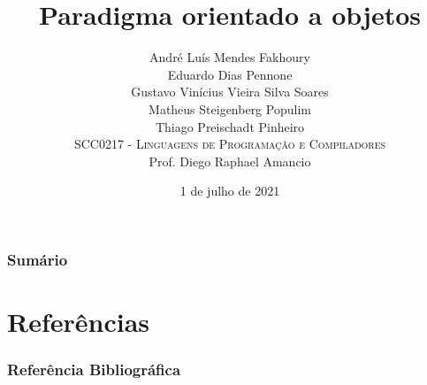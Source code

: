 \documentclass{beamer}
\title[Paradigma orientado a objetos]{Paradigma orientado a objetos}
\author[André, Eduardo, Gustavo, Matheus, Thiago]{
André Luís Mendes Fakhoury\\ Eduardo Dias Pennone\\ Gustavo Vinícius Vieira Silva Soares\\ Matheus Steigenberg Populim\\ Thiago Preischadt Pinheiro\\ \bigskip
\textsc{SCC0217 - Linguagens de Programação e Compiladores}\\
Prof. Diego Raphael Amancio
}
\institute[ICMC/USP]{ICMC - USP}
\date[2021]{\footnotesize{1 de julho de 2021}}
\begin{document}
    
    \begin{frame}[plain]
        \titlepage
    \end{frame}
    
    \begin{frame}
      \frametitle{Sumário}
      \tableofcontents
    \end{frame}
    











\section{Referências}

\nocite{*}
\begin{frame}[allowframebreaks]
  \frametitle{Referência Bibliográfica}
  
  
  
\end{frame}
\end{document}
